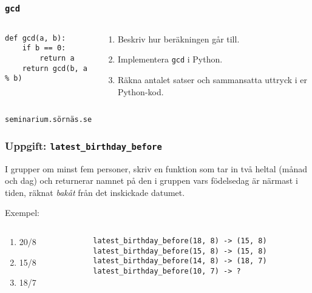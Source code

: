 \documentclass{beamer}
\begin{document}
  \begin{frame}[fragile]
    \frametitle{\texttt{gcd}}

    \begin{columns}
      \begin{column}{0.48\textwidth}
        \begin{verbatim}
def gcd(a, b):
    if b == 0:
        return a
    return gcd(b, a % b)
        \end{verbatim}
      \end{column}%
      \begin{column}{0.48\textwidth}
        \begin{enumerate}
          \item Beskriv hur beräkningen går till.
          \item Implementera \texttt{gcd} i Python.
          \item Räkna antalet satser och sammansatta uttryck i er Python-kod.
        \end{enumerate}
      \end{column}%
    \end{columns}

    \vfill{}
    \hfill{} \texttt{seminarium.sörnäs.se} \\
  \end{frame}

  \begin{frame}
    \frametitle{Uppgift: \texttt{latest\_birthday\_before}}

    I grupper om minst fem personer, skriv en funktion som tar in två heltal
    (månad och dag) och returnerar namnet på den i gruppen vars födelsedag är
    närmast i tiden, räknat \emph{bakåt} från det inskickade datumet.

    \pause
    \vspace{1em}

    Exempel:

    \begin{columns}[T]
      \begin{column}{0.2\textwidth}
        \begin{enumerate}
          \item 20/8
          \item 15/8
          \item 18/7
        \end{enumerate}
      \end{column}%
      \begin{column}{0.78\textwidth}
        \texttt{latest\_birthday\_before(18, 8) -> (15, 8)}\\
        \texttt{latest\_birthday\_before(15, 8) -> (15, 8)}\\
        \texttt{latest\_birthday\_before(14, 8) -> (18, 7)}\\
        \pause
        \texttt{latest\_birthday\_before(10, 7) -> ?}
      \end{column}%
    \end{columns}
  \end{frame}
\end{document}
